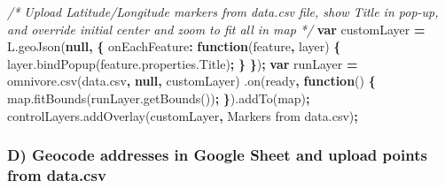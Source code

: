 \documentclass[
  english,
]{book}
\newenvironment{Shaded}{\begin{snugshade}}{\end{snugshade}}
\newcommand{\AttributeTok}[1]{\textcolor[rgb]{0.77,0.63,0.00}{#1}}
\newcommand{\CommentTok}[1]{\textcolor[rgb]{0.56,0.35,0.01}{\textit{#1}}}
\newcommand{\DataTypeTok}[1]{\textcolor[rgb]{0.13,0.29,0.53}{#1}}
\newcommand{\KeywordTok}[1]{\textcolor[rgb]{0.13,0.29,0.53}{\textbf{#1}}}
\newcommand{\NormalTok}[1]{#1}
\newcommand{\OperatorTok}[1]{\textcolor[rgb]{0.81,0.36,0.00}{\textbf{#1}}}
\newcommand{\StringTok}[1]{\textcolor[rgb]{0.31,0.60,0.02}{#1}}
\newcommand{\VariableTok}[1]{\textcolor[rgb]{0.00,0.00,0.00}{#1}}
\begin{document}
\begin{Shaded}
\begin{Highlighting}[]
\CommentTok{/* Upload Latitude/Longitude markers from data.csv file, show Title in pop{-}up, and override initial center and zoom to fit all in map */}
 \KeywordTok{var}\NormalTok{ customLayer }\OperatorTok{=} \VariableTok{L}\NormalTok{.}\AttributeTok{geoJson}\NormalTok{(}\KeywordTok{null}\OperatorTok{,} \OperatorTok{\{}
  \DataTypeTok{onEachFeature}\OperatorTok{:} \KeywordTok{function}\NormalTok{(feature}\OperatorTok{,}\NormalTok{ layer) }\OperatorTok{\{}
    \VariableTok{layer}\NormalTok{.}\AttributeTok{bindPopup}\NormalTok{(}\VariableTok{feature}\NormalTok{.}\VariableTok{properties}\NormalTok{.}\AttributeTok{Title}\NormalTok{)}\OperatorTok{;}
  \OperatorTok{\}}
 \OperatorTok{\}}\NormalTok{)}\OperatorTok{;}
 \KeywordTok{var}\NormalTok{ runLayer }\OperatorTok{=} \VariableTok{omnivore}\NormalTok{.}\AttributeTok{csv}\NormalTok{(}\StringTok{\textquotesingle{}data.csv\textquotesingle{}}\OperatorTok{,} \KeywordTok{null}\OperatorTok{,}\NormalTok{ customLayer)}
\NormalTok{ .}\AttributeTok{on}\NormalTok{(}\StringTok{\textquotesingle{}ready\textquotesingle{}}\OperatorTok{,} \KeywordTok{function}\NormalTok{() }\OperatorTok{\{}
  \VariableTok{map}\NormalTok{.}\AttributeTok{fitBounds}\NormalTok{(}\VariableTok{runLayer}\NormalTok{.}\AttributeTok{getBounds}\NormalTok{())}\OperatorTok{;}
 \OperatorTok{\}}\NormalTok{).}\AttributeTok{addTo}\NormalTok{(map)}\OperatorTok{;}
 \VariableTok{controlLayers}\NormalTok{.}\AttributeTok{addOverlay}\NormalTok{(customLayer}\OperatorTok{,} \StringTok{\textquotesingle{}Markers from data.csv\textquotesingle{}}\NormalTok{)}\OperatorTok{;}
\end{Highlighting}
\end{Shaded}

\hypertarget{d-geocode-addresses-in-google-sheet-and-upload-points-from-data.csv}{%
\subsubsection*{D) Geocode addresses in Google Sheet and upload points from data.csv}\label{d-geocode-addresses-in-google-sheet-and-upload-points-from-data.csv}}
\end{document}
